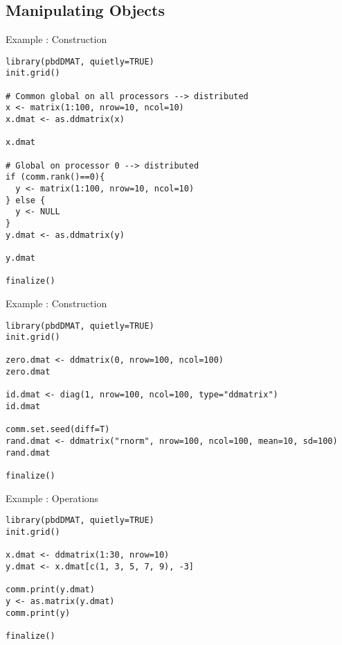 \subsection{Manipulating  Objects}
\makesubcontentsslidessec

\begin{frame}[fragile]
  \begin{exampleblock}{Example \countex:   Construction}\pause
    \begin{lstlisting}[title=Generate a global matrix and distribute it (1\_gen.r)]
library(pbdDMAT, quietly=TRUE)
init.grid()

# Common global on all processors --> distributed
x <- matrix(1:100, nrow=10, ncol=10)
x.dmat <- as.ddmatrix(x)

x.dmat

# Global on processor 0 --> distributed
if (comm.rank()==0){
  y <- matrix(1:100, nrow=10, ncol=10)
} else {
  y <- NULL
}
y.dmat <- as.ddmatrix(y)

y.dmat

finalize()
    \end{lstlisting}
  \end{exampleblock}
\end{frame}

\begin{frame}[fragile]
  \begin{exampleblock}{Example \countex:   Construction}\pause
    \begin{lstlisting}[title=Generate locally only what is needed (2\_gen.r)]
library(pbdDMAT, quietly=TRUE)
init.grid()

zero.dmat <- ddmatrix(0, nrow=100, ncol=100)
zero.dmat

id.dmat <- diag(1, nrow=100, ncol=100, type="ddmatrix")
id.dmat

comm.set.seed(diff=T)
rand.dmat <- ddmatrix("rnorm", nrow=100, ncol=100, mean=10, sd=100)
rand.dmat

finalize()
    \end{lstlisting}
  \end{exampleblock}
\end{frame}

\begin{frame}[fragile]
  \begin{exampleblock}{Example \countex:   Operations}\pause
    \begin{lstlisting}[title=Extract rows sor columns (3\_extract.r)]
library(pbdDMAT, quietly=TRUE)
init.grid()

x.dmat <- ddmatrix(1:30, nrow=10)
y.dmat <- x.dmat[c(1, 3, 5, 7, 9), -3]

comm.print(y.dmat)
y <- as.matrix(y.dmat)
comm.print(y)

finalize()
    \end{lstlisting}
  \end{exampleblock}
\end{frame}

